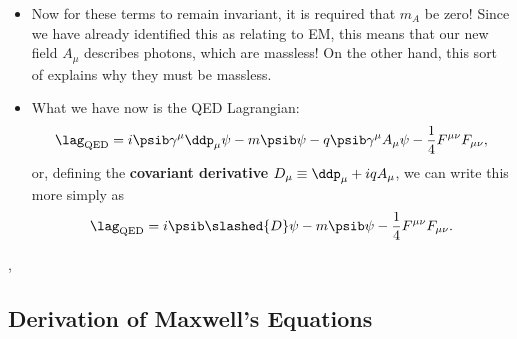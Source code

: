 \begin{itemize}
    \item Now for these terms to remain invariant, it is required that $m_A$ be zero! Since we have already identified this as relating to EM, this means that our new field $A_{\mu}$ describes photons, which are massless! On the other hand, this sort of explains why they must be massless.
    \item What we have now is the QED Lagrangian:
        \begin{equation}
            \lag_{\mathrm{QED}} = i\psib\gamma^{\mu}\ddp_{\mu}\psi - m\psib\psi - q\psib \gamma^{\mu} A_{\mu} \psi - \frac{1}{4}F^{\mu\nu}F_{\mu\nu},
        \end{equation}
        or, defining the \textbf{covariant derivative} $D_{\mu} \equiv \ddp_{\mu} + iqA_{\mu}$, we can write this more simply as
        \begin{equation}
            \lag_{\mathrm{QED}} = i\psib \slashed{D} \psi - m\psib\psi - \frac{1}{4}F^{\mu\nu}F_{\mu\nu}.\label{QEDLagrangian}
        \end{equation}
\end{itemize}


\sep 


\subsection*{Derivation of Maxwell's Equations}

